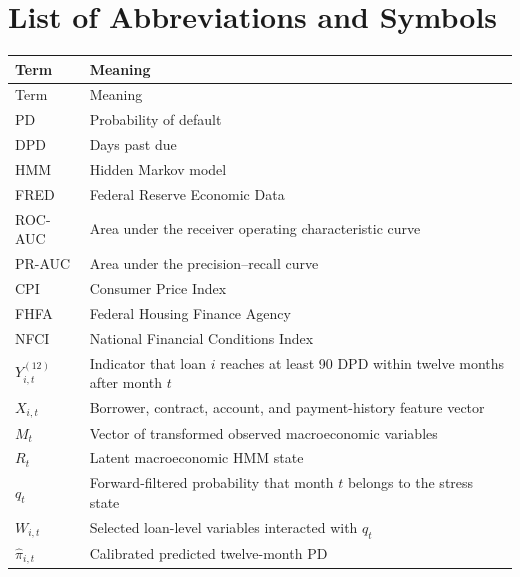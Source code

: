 \chapter*{List of Abbreviations and Symbols}
\begin{longtable}{L{0.22\textwidth}L{0.68\textwidth}}
\toprule
Term & Meaning \\
\midrule
\endfirsthead
\toprule
Term & Meaning \\
\midrule
\endhead
PD & Probability of default \\
DPD & Days past due \\
HMM & Hidden Markov model \\
FRED & Federal Reserve Economic Data \\
ROC-AUC & Area under the receiver operating characteristic curve \\
PR-AUC & Area under the precision--recall curve \\
CPI & Consumer Price Index \\
FHFA & Federal Housing Finance Agency \\
NFCI & National Financial Conditions Index \\
$Y_{i,t}^{(12)}$ & Indicator that loan $i$ reaches at least 90 DPD within twelve months after month $t$ \\
$X_{i,t}$ & Borrower, contract, account, and payment-history feature vector \\
$M_t$ & Vector of transformed observed macroeconomic variables \\
$R_t$ & Latent macroeconomic HMM state \\
$q_t$ & Forward-filtered probability that month $t$ belongs to the stress state \\
$W_{i,t}$ & Selected loan-level variables interacted with $q_t$ \\
$\widehat\pi_{i,t}$ & Calibrated predicted twelve-month PD \\
\bottomrule
\end{longtable}

\clearpage
{}
\hypersetup{pageanchor=false}
